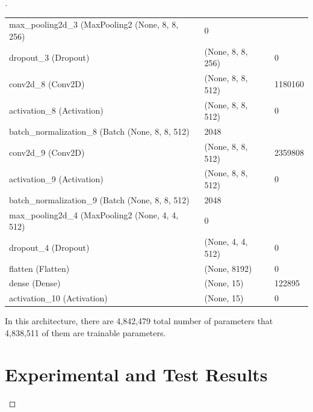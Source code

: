 \documentclass[12pt,oneside,geqno]{article}
\begin{document}
\begin{proof}[\color{red}{Solution}]
\begin{table}[]
\begin{tabular}{lll}
				max\_pooling2d\_3 (MaxPooling2 (None, 8, 8, 256)    & 0                                 &                               \\
				dropout\_3 (Dropout)                                & (None, 8, 8, 256)                 & 0                             \\
				conv2d\_8 (Conv2D)                                  & (None, 8, 8, 512)                 & 1180160                       \\
				activation\_8 (Activation)                          & (None, 8, 8, 512)                 & 0                             \\
				batch\_normalization\_8 (Batch (None, 8, 8, 512)    & 2048                              &                               \\
				conv2d\_9 (Conv2D)                                  & (None, 8, 8, 512)                 & 2359808                       \\
				activation\_9 (Activation)                          & (None, 8, 8, 512)                 & 0                             \\
				batch\_normalization\_9 (Batch (None, 8, 8, 512)    & 2048                              &                               \\
				max\_pooling2d\_4 (MaxPooling2 (None, 4, 4, 512)    & 0                                 &                               \\
				dropout\_4 (Dropout)                                & (None, 4, 4, 512)                 & 0                             \\
				flatten (Flatten)                                   & (None, 8192)                      & 0                             \\
				dense (Dense)                                       & (None, 15)                        & 122895                        \\
				activation\_10 (Activation)                         & (None, 15)                        & 0                            
			\end{tabular}
		\end{table}
		
		In this architecture, there are 4,842,479 total number of parameters that 4,838,511 of them are trainable parameters.
		
		
		\section{Experimental and Test Results}
		

\end{proof}
\end{document}
